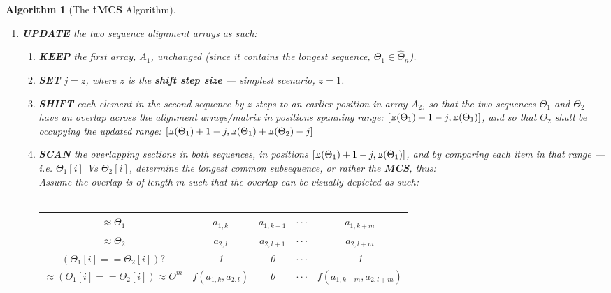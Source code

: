 \documentclass[a4paper, 18pt]{book} %
\newtheorem{alg}{Algorithm}
\newcommand{\invpi}{\rotatebox[origin=c]{180}{$\pi$}}
\begin{document}
\begin{alg}[The \textbf{tMCS} Algorithm]
\begin{enumerate}
{Visually, we can express this as:\\\\

\begin{tabular}[H]{|c||c|c|c|c|c|c|c|c|c|c|}
\hline
$A_1$ & $a_{1,1}$ & $a_{1,2}$ & $\cdot\cdot\cdot$ & $a_{1,\invpi(\Theta_1)}$ & & & & & & \\
\hline
$A_2$ & & & & & $a_{2,1}$ & $a_{2,2}$ & $\cdot\cdot\cdot$ & $a_{2,\invpi(\Theta_1)}$ & & \\
\hline
 
\end{tabular}\\\\


}
\item{
\textbf{UPDATE}  the two sequence alignment arrays as such:
\begin{enumerate}
\item{
\textbf{KEEP}  the first array, $A_1$, unchanged (since it contains the longest sequence, $\Theta_1 \in \hat{\Theta}_n$).
}
\item \textbf{SET}  $j = z$, where $z$ is the \textbf{shift step size} --- simplest scenario, $z = 1$.
\item {\textbf{SHIFT}  each element in the second sequence by $z$-steps to an earlier position in array $A_2$, so that the two sequences $\Theta_1$ and $\Theta_2$ have an overlap across the alignment arrays/matrix in positions spanning range: $[\invpi(\Theta_1)+1-j, \invpi(\Theta_1)]$, and so that $\Theta_2$ shall be occupying the updated range: $[\invpi(\Theta_1)+1 - j, \invpi(\Theta_1)+\invpi(\Theta_2) - j]$}
\item {
\textbf{SCAN}  the overlapping sections in both sequences, in positions  $[\invpi(\Theta_1)+1-j, \invpi(\Theta_1)]$, and by comparing each item in that range --- i.e. $\Theta_1[i]$ Vs $\Theta_2[i]$, determine the longest common subsequence, or rather the \textbf{MCS}, thus:\\

Assume the overlap is of length $m$ such that the overlap can be visually depicted as such:\\\\

\begin{tabular}[H]{|c||c|c|c|c|}
\hline
$\approx \Theta_1$ & $a_{1,k}$ & $a_{1,k+1}$ & $\cdot\cdot\cdot$ & $a_{1,k+m}$\\
\hline
$\approx \Theta_2$ & $a_{2,l}$ & $a_{2,l+1}$ & $\cdot\cdot\cdot$ & $a_{2,l+m}$\\
\hline
$(\Theta_1[i] == \Theta_2[i])?$ & 1 & 0 &  $\cdot\cdot\cdot$ & 1\\
\hline
$\approx (\Theta_1[i] == \Theta_2[i]) \approx O^m$ & $f(a_{1,k},a_{2,l})$ & 0 &  $\cdot\cdot\cdot$ & $f(a_{1,k+m},a_{2,l+m})$ \\
\hline
 \end{tabular}\\\\
 
}
\end{enumerate}}
\end{enumerate}
\end{alg}
\end{document}
